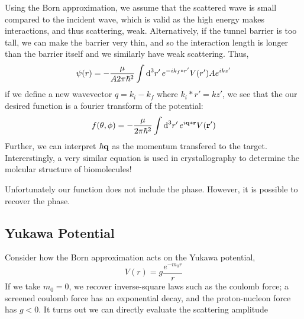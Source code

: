 Using the Born approximation, we assume that the scattered wave is small compared to the incident wave, which is valid as the high energy makes interactions, and thus scattering, weak. Alternatively, if the tunnel barrier is too tall, we can make the barrier very thin, and so the interaction length is longer than the barrier itself and we similarly have weak scattering. Thus,
\begin{align*}
	\p(r)&=-\frac{\mu}{A2\pi\hbar^2}\int\d[3]{r'}e^{-ik_f*r'}V(r')Ae^{ikz'}\\
\end{align*}
if we define a new wavevector \(q = k_i-k_f\) where \(k_i*r' = kz'\), we see that the our desired function is a fourier transform of the potential:
\begin{equation}
	f(\theta,\phi) = -\frac{\mu}{2\pi\hbar^2}\int\d[3]{r'}e^{i\vb q*\vb r}V(\vb r')
\end{equation}
Further, we can interpret \(\hbar \mathbf{q}\) as the momentum transfered to the target. Intererstingly, a very similar equation is used in crystallography to determine the molcular structure of biomolecules!

Unfortunately our function does not include the phase. However, it is possible to recover the phase.

\subsection{Yukawa Potential}
Consider how the Born approximation acts on the Yukawa potential,
\begin{equation}
	V(r) = g\frac{e^{-m_0 r}}{r}
\end{equation}
If we take \(m_0=0\), we recover inverse-square laws such as the coulomb force; a screened coulomb force has an exponential decay, and the proton-nucleon force has \(g<0\). It turns out we can directly evaluate the scattering amplitude


